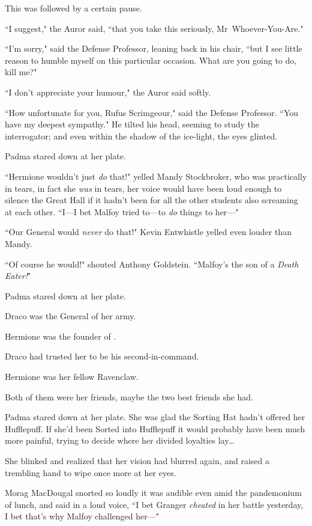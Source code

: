 This was followed by a certain pause.

``I suggest," the Auror said, ``that you take this seriously, Mr~Whoever-You-Are."

``I'm sorry," said the Defense Professor, leaning back in his chair, ``but I see little reason to humble myself on this particular occasion. What are you going to do, kill me?"

``I don't appreciate your humour," the Auror said softly.

``How unfortunate for you, Rufus Scrimgeour," said the Defense Professor. ``You have my deepest sympathy." He tilted his head, seeming to study the interrogator; and even within the shadow of the ice-light, the eyes glinted.

\later

Padma stared down at her plate.

``Hermione wouldn't just \emph{do} that!" yelled Mandy Stockbroker, who was practically in tears, in fact she \emph{was} in tears, her voice would have been loud enough to silence the Great Hall if it hadn't been for all the other students also screaming at each other. ``I—I bet Malfoy tried to—to \emph{do} things to her—"

``Our General would \emph{never} do that!" Kevin Entwhistle yelled even louder than Mandy.

``Of course he would!" shouted Anthony Goldstein. ``Malfoy's the son of a \emph{Death Eater!}"

Padma stared down at her plate.

Draco was the General of her army.

Hermione was the founder of \SPHEW.

Draco had trusted her to be his second-in-command.

Hermione was her fellow Ravenclaw.

Both of them were her friends, maybe the two best friends she had.

Padma stared down at her plate. She was glad the Sorting Hat hadn't offered her Hufflepuff. If she'd been Sorted into Hufflepuff it would probably have been much more painful, trying to decide where her divided loyalties lay{\ldots}

She blinked and realized that her vision had blurred again, and raised a trembling hand to wipe once more at her eyes.

Morag MacDougal snorted so loudly it was audible even amid the pandemonium of lunch, and said in a loud voice, ``I bet Granger \emph{cheated} in her battle yesterday, I bet that's why Malfoy challenged her—"

